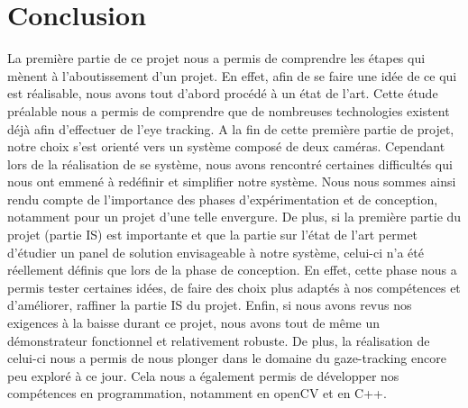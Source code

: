 \section*{Conclusion}

La première partie de ce projet nous a permis de comprendre les étapes qui mènent à l’aboutissement d’un projet. En effet, afin de se faire une idée de ce qui est réalisable, nous avons tout d’abord procédé à un état de l’art. Cette étude préalable nous a permis de comprendre que de nombreuses technologies existent déjà afin d’effectuer de l’eye tracking. A la fin de cette première partie de projet, notre choix s’est orienté vers un système composé de deux caméras. Cependant lors de la réalisation de se système, nous avons rencontré certaines difficultés qui nous ont emmené à redéfinir et simplifier notre système. Nous nous sommes ainsi rendu compte de l’importance des phases d’expérimentation et de conception, notamment pour un projet d’une telle envergure. 
\bigbreak
De plus, si la première partie du projet (partie IS) est importante et que la partie sur l’état de l’art permet d’étudier un panel de solution envisageable à notre système, celui-ci n’a été réellement définis que lors de la phase de conception. En effet, cette phase nous a permis tester certaines idées, de faire des choix plus adaptés à nos compétences et d’améliorer, raffiner la partie IS du projet.
\bigbreak
Enfin, si nous avons revus nos exigences à la baisse durant ce projet, nous avons tout de même un démonstrateur fonctionnel et relativement robuste. De plus, la réalisation de celui-ci nous a permis de nous plonger dans le domaine du gaze-tracking encore peu exploré à ce jour. Cela nous a également permis de développer nos compétences en programmation, notamment en openCV et en C++.
